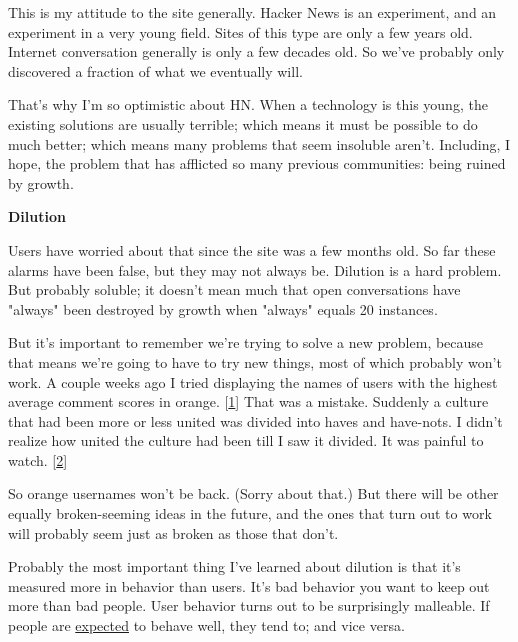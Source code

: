 This is my attitude to the site
                  generally. Hacker News is an experiment, and an experiment in
                  a very young field. Sites of this type are only a few years
                  old. Internet conversation generally is only a few decades
                  old. So we've probably only discovered a fraction of what we
                  eventually will.

That's why I'm so optimistic about
                  HN. When a technology is this young, the existing solutions
                  are usually terrible; which means it must be possible to do
                  much better; which means many problems that seem insoluble
                  aren't. Including, I hope, the problem that has afflicted so
                  many previous communities: being ruined by growth.

\textbf{Dilution}

Users have worried about that since the site was
                  a few months old. So far these alarms have been false, but
                  they may not always be. Dilution is a hard problem. But
                  probably soluble; it doesn't mean much that open conversations
                  have "always" been destroyed by growth when "always" equals 20
                  instances.

But it's important to remember we're
                  trying to solve a new problem, because that means we're going
                  to have to try new things, most of which probably won't work.
                  A couple weeks ago I tried displaying the names of users with
                  the highest average comment scores in orange.
                  [\href{\#f1n}{1}]
                  That was a mistake. Suddenly a culture that had been more or
                  less united was divided into haves and have-nots. I didn't
                  realize how united the culture had been till I saw it divided.
                  It was painful to watch.
                  [\href{\#f2n}{2}]

So orange usernames won't be back. (Sorry about
                  that.) But there will be other equally broken-seeming ideas in
                  the future, and the ones that turn out to work will probably
                  seem just as broken as those that don't.

Probably
                  the most important thing I've learned about dilution is that
                  it's measured more in behavior than users. It's bad behavior
                  you want to keep out more than bad people. User behavior turns
                  out to be surprisingly malleable. If people are
                  \href{http://ycombinator.com/newswelcome.html}{expected}
                  to behave well, they tend to; and vice versa.

